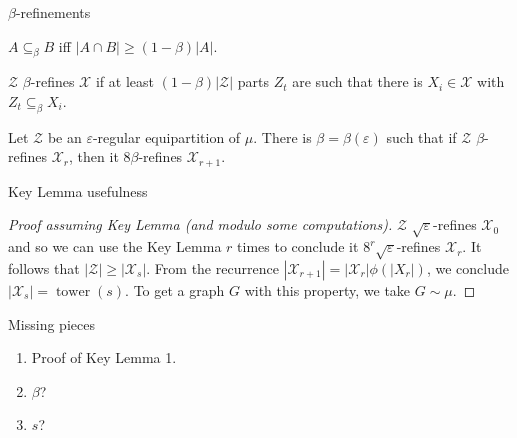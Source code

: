 \documentclass{beamer}
\DeclareMathOperator{\twr}{\mathrm{tower}}
\newcommand{\1}{\mathbbm{1}}
\newcommand{\X}{\mathcal{X}}
\newcommand{\Z}{\mathcal{Z}}
\newcommand{\eps}{\varepsilon}
\begin{document}
\begin{frame}{}

\end{frame}

\begin{frame}{$\beta$-refinements}
  \begin{definition}
    $A \subseteq_\beta B$ iff $|A \cap B| \ge (1 - \beta)|A|$.
  \end{definition}

  \pause

  \begin{definition}[$\Z$ $\beta$-refining $\X$]
    $\Z$ $\beta$-refines $\X$ if at least $(1 - \beta)|\Z|$ parts $Z_t$ are such that
    there is $X_i \in \X$ with $Z_t \subseteq_\beta X_i$.
  \end{definition}

  \pause

  \begin{lemma}
    Let $\Z$ be an $\eps$-regular equipartition of $\mu$. There is $\beta = \beta(\eps)$
    such that if $\Z$ $\beta$-refines $\X_r$, then it $8\beta$-refines $\X_{r + 1}$.
  \end{lemma}
\end{frame}

\begin{frame}{Key Lemma usefulness}
  \begin{proof}[Proof assuming Key Lemma (and modulo some computations)]
    \pause
    $\Z$ $\sqrt{\eps}$-refines $\X_0$ and so we can use the Key Lemma $r$ times to
    conclude it $8^r \sqrt{\eps}$-refines $\X_r$.
    \pause
    It follows that $|\Z| \ge |\X_s|$.
    \pause
    From the recurrence $|\X_{r + 1}| = |\X_r| \phi(|X_r|)$, we conclude $|\X_s| =
      \twr(s)$.
    \pause
    To get a graph $G$ with this property, we take $G \sim \mu$.
  \end{proof}

  \pause

  \begin{block}{Missing pieces}
    \begin{enumerate}
      \item Proof of Key Lemma 1.
            \pause
      \item $\beta$?
            \pause
      \item $s$?
    \end{enumerate}
  \end{block}
\end{frame}
\end{document}
